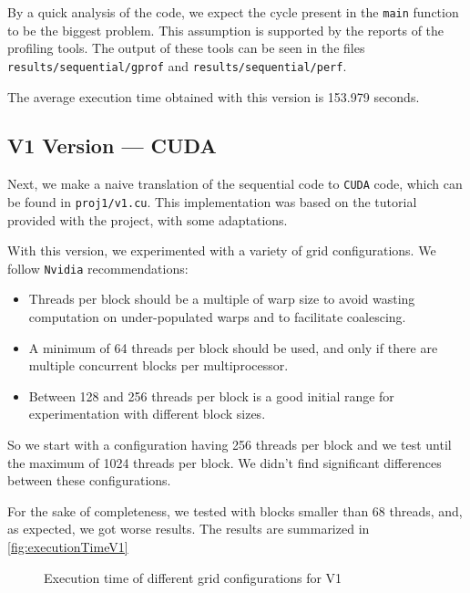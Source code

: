 \documentclass[conference]{IEEEtran}
\begin{document}
By a quick analysis of the code, we expect the cycle present in the \texttt{main} function to be the biggest problem. This assumption is supported by the reports of the profiling tools. The output of these tools can be seen in the files \texttt{results/sequential/gprof} and \texttt{results/sequential/perf}.

The average execution time obtained with this version is 153.979 seconds.

\subsection{V1 Version --- CUDA}
Next, we make a naive translation of the sequential code to \texttt{CUDA} code, which can be found in \texttt{proj1/v1.cu}. This implementation was based on the tutorial provided with the project\cite{SolvingHeatEquation}, with some adaptations.

With this version, we experimented with a variety of grid configurations. We follow \texttt{Nvidia} recommendations\cite{CUDABestPractices}:

\begin{itemize}
  \item Threads per block should be a multiple of warp size to avoid wasting computation on under-populated warps and to facilitate coalescing.
  \item A minimum of 64 threads per block should be used, and only if there are multiple concurrent blocks per multiprocessor.
  \item Between 128 and 256 threads per block is a good initial range for experimentation with different block sizes.
\end{itemize}

So we start with a configuration having 256 threads per block and we test until the maximum of 1024 threads per block. We didn't find significant differences between these configurations.

For the sake of completeness, we tested with blocks smaller than 68 threads, and, as expected, we got worse results. The results are summarized in \autoref{fig:executionTimeV1}


\begin{figure}[ht]
  \centering
  \caption{Execution time of different grid configurations for V1}
  \label{fig:executionTimeV1}
\end{figure}
\end{document}
